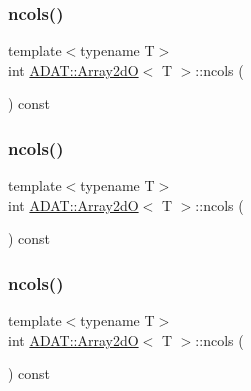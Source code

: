 \subsubsection{\texorpdfstring{ncols()}{ncols()}\hspace{0.1cm}{\footnotesize\ttfamily [1/3]}}
{\footnotesize\ttfamily template$<$typename T$>$ \\
int \mbox{\hyperlink{classADAT_1_1Array2dO}{A\+D\+A\+T\+::\+Array2dO}}$<$ T $>$\+::ncols (\begin{DoxyParamCaption}{ }\end{DoxyParamCaption}) const\hspace{0.3cm}{\ttfamily [inline]}}

\mbox{\label{classADAT_1_1Array2dO_a68d75259fbc18eb14504e3b6d74f2484}} 
\subsubsection{\texorpdfstring{ncols()}{ncols()}\hspace{0.1cm}{\footnotesize\ttfamily [2/3]}}
{\footnotesize\ttfamily template$<$typename T$>$ \\
int \mbox{\hyperlink{classADAT_1_1Array2dO}{A\+D\+A\+T\+::\+Array2dO}}$<$ T $>$\+::ncols (\begin{DoxyParamCaption}{ }\end{DoxyParamCaption}) const\hspace{0.3cm}{\ttfamily [inline]}}

\mbox{\label{classADAT_1_1Array2dO_a68d75259fbc18eb14504e3b6d74f2484}} 
\subsubsection{\texorpdfstring{ncols()}{ncols()}\hspace{0.1cm}{\footnotesize\ttfamily [3/3]}}
{\footnotesize\ttfamily template$<$typename T$>$ \\
int \mbox{\hyperlink{classADAT_1_1Array2dO}{A\+D\+A\+T\+::\+Array2dO}}$<$ T $>$\+::ncols (\begin{DoxyParamCaption}{ }\end{DoxyParamCaption}) const\hspace{0.3cm}{\ttfamily [inline]}}

